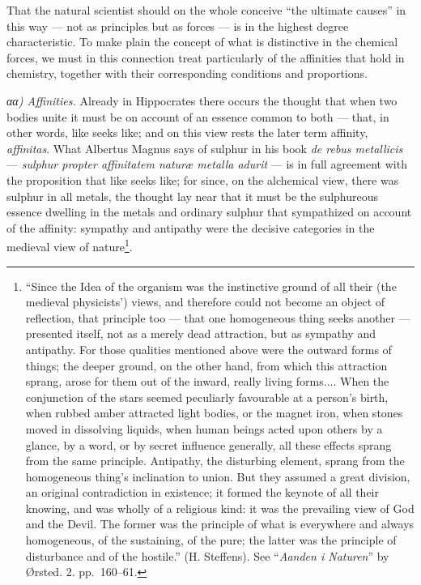\documentclass[12pt,a4paper]{book}
\begin{document}
That the natural scientist should on the whole conceive ``the ultimate causes''
in this way --- not as principles but as forces --- is in the highest degree
characteristic. To make plain the concept of what is distinctive in the
chemical forces, we must in this connection treat particularly of the
affinities that hold in chemistry, together with their corresponding conditions
and proportions.

\emph{αα) Affinities.} Already in Hippocrates there occurs the thought that
when two bodies unite it must be on account of an essence common to both ---
that, in other words, like seeks like; and on this view rests the later term
affinity, \textit{affinitas}. What Albertus Magnus says of sulphur in his book
\textit{de rebus metallicis} --- \textit{sulphur propter affinitatem naturæ
metalla adurit} --- is in full agreement with the proposition that like seeks
like; for since, on the alchemical view, there was sulphur in all metals, the
thought lay near that it must be the sulphureous essence dwelling in the metals
and ordinary sulphur that sympathized on account of the affinity: sympathy and
antipathy
\setcounter{footnote}{0}
were the decisive categories in the medieval view of
nature\footnote{``Since the Idea of the organism was the instinctive ground of
all their (the medieval physicists') views, and therefore could not become an
object of reflection, that principle too --- that one homogeneous thing seeks
another --- presented itself, not as a merely dead attraction, but as sympathy
and antipathy. For those qualities mentioned above were the outward forms of
things; the deeper ground, on the other hand, from which this attraction
sprang, arose for them out of the inward, really living forms.... When the
conjunction of the stars seemed peculiarly favourable at a person's birth, when
rubbed amber attracted light bodies, or the magnet iron, when stones moved in
dissolving liquids, when human beings acted upon others by a glance, by a word,
or by secret influence generally, all these effects sprang from the same
principle. Antipathy, the disturbing element, sprang from the homogeneous
thing's inclination to union. But they assumed a great division, an original
contradiction in existence; it formed the keynote of all their knowing, and was
wholly of a religious kind: it was the prevailing view of God and the Devil.
The former was the principle of what is everywhere and always homogeneous, of
the sustaining, of the pure; the latter was the principle of disturbance and of
the hostile.'' (H. Steffens). See ``\emph{Aanden i Naturen}'' by Ørsted.
2. pp.~160--61.}.
\end{document}
